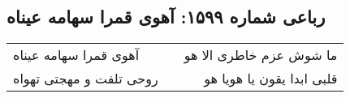 \begin{center}
\section*{رباعی شماره ۱۵۹۹: آهوی قمرا سهامه عیناه}
\label{sec:1599}
\begin{longtable}{l p{0.5cm} r}
آهوی قمرا سهامه عیناه
&&
ما شوش عزم خاطری الا هو
\\
روحی تلفت و مهجتی تهواه
&&
قلبی ابدا یقون یا هویا هو
\\
\end{longtable}
\end{center}
